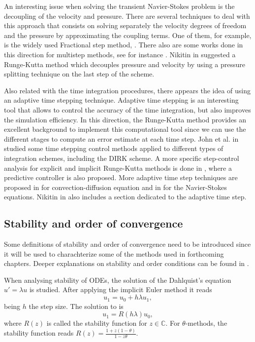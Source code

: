An interesting issue when solving the transient Navier-Stokes problem is the decoupling of the velocity and pressure. There are several techniques to deal with this approach that consists on solving separately the velocity degrees of freedom and the pressure by approximating the coupling terms. One of them, for example, is the widely used Fractional step method, \cite{donea_finite_1982}. There also are some works done in this direction for multistep methods, see for instance \cite{kim_application_1985}. Nikitin in \cite{nikitin_third-order-accurate_2006} suggested a Runge-Kutta method which decouples pressure and velocity by using a pressure splitting technique on the last step of the scheme.

Also related with the time integration procedures, there appears the idea of using an adaptive time stepping technique. Adaptive time stepping is an interesting tool that allows to control the accuracy of the time integration, but also improves the simulation efficiency. In this direction, the Runge-Kutta method provides an excellent background to implement this computational tool since we can use the different stages to compute an error estimate at each time step. John et al. in \cite{john_adaptive_2010} studied some time stepping control methods applied to different types of integration schemes, including the DIRK scheme. A more specific step-control analysis for explicit and implicit Runge-Kutta methods is done in \cite{hairer_solving_1993}, where a predictive controller is also proposed. More adaptive time step techniques are proposed in \cite{gresho_adaptive_2008} for convection-diffusion equation and in \cite{kay_adaptive_2010} for the Navier-Stokes equations. Nikitin in \cite{nikitin_third-order-accurate_2006} also includes a section dedicated to the adaptive time step.


\subsection{Stability and order of convergence}
Some definitions of stability and order of convergence need to be introduced since it will be used to charachterize some of the methods used in forthcoming chapters. Deeper explanations on stability and order conditions can be found in \cite{hairer_solving_2008,hairer_solving_1993}.

When analysing stability of ODEs, the solution of the Dahlquist's equation $ u'=\lambda u $ is studied. After applying the implicit Euler method it reads
\begin{equation}
\label{eq-C2_Dahlquist}
u_1=u_0+h\lambda u_1,
\end{equation}
being $ h $ the step size. The solution to  is
\begin{equation}
\label{eq-C2_Dahlquist_sol}
u_1=R(h\lambda)u_0,
\end{equation}
where $ R(z) $ is called the stability function for $ z\in\mathbb{C} $. For $ \theta $-methods, the stability function reads $ R(z)=\frac{1+z(1-\theta)}{1-z\theta} $.

